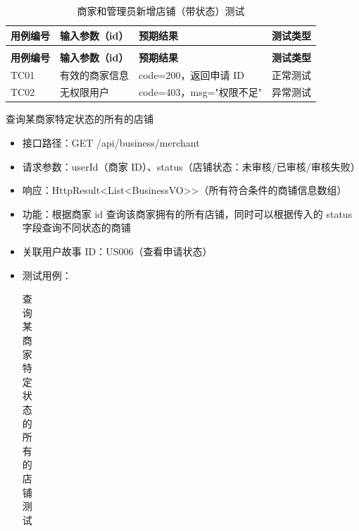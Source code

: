\begin{levellist}
\begin{levellist}
\begin{itemize}
\begin{longtable}{>{\centering\arraybackslash}m{2cm} >{\centering\arraybackslash}m{4cm} >{\centering\arraybackslash}m{5cm} >{\centering\arraybackslash}m{2cm}}
                      \caption{商家和管理员新增店铺（带状态）测试} \label{tab:training}                        \\

                      \toprule
                      \textbf{用例编号} & \textbf{输入参数（id）} & \textbf{预期结果}       & \textbf{测试类型} \\
                      \midrule
                      \endfirsthead

                      \multicolumn{4}{c}{{\tablename\ \thetable{} 续表}}                        \\
                      \toprule
                      \textbf{用例编号} & \textbf{输入参数（id）} & \textbf{预期结果}       & \textbf{测试类型} \\
                      \midrule
                      \endhead

                      \bottomrule
                      \endfoot

                      TC01          & 有效的商家信息           & code=200，返回申请 ID    & 正常测试          \\
                      TC02          & 无权限用户             & code=403，msg="权限不足" & 异常测试          \\
                  \end{longtable}
        \end{itemize}

        \item 查询某商家特定状态的所有的店铺
        \begin{itemize}
            \item 接口路径：GET /api/business/merchant
            \item 请求参数：userId（商家 ID）、status（店铺状态：未审核/已审核/审核失败）
            \item 响应：HttpResult<List<BusinessVO>>（所有符合条件的商铺信息数组）
            \item 功能：根据商家 id 查询该商家拥有的所有店铺，同时可以根据传入的 status 字段查询不同状态的商铺
            \item 关联用户故事 ID：US006（查看申请状态）
            \item 测试用例：
                  \begin{longtable}{>{\centering\arraybackslash}m{2cm} >{\centering\arraybackslash}m{4cm} >{\centering\arraybackslash}m{5cm} >{\centering\arraybackslash}m{2cm}}

                      \caption{查询某商家特定状态的所有的店铺测试} \label{tab:training}                           \\


\end{longtable}
\end{itemize}
\end{levellist}
\end{levellist}
